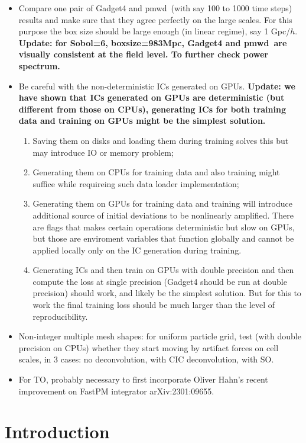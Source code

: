 \documentclass[usenatbib]{mnras}
\newcommand{\pmwd}{{\usefont{T1}{nova}{m}{sl}pmwd}}
\begin{document}
\begin{itemize}
\item Compare one pair of Gadget4 and \pmwd\ (with say 100 to 1000 time
    steps) results and make sure that they agree perfectly on the large
    scales. For this purpose the box size should be large enough (in
    linear regime), say 1 Gpc/$h$.
    \textbf{Update: for Sobol=6, boxsize=983Mpc, Gadget4 and \pmwd\ are visually
    consistent at the field level. To further check power spectrum.}
\item Be careful with the non-deterministic ICs generated on GPUs.
      \textbf{Update: we have shown that ICs generated on GPUs are deterministic
      (but different from those on CPUs), generating ICs for both training data
      and training on GPUs might be the simplest solution.}
  \begin{enumerate}
  \item Saving them on disks and loading them during training solves
    this but may introduce IO or memory problem;
  \item Generating them on CPUs for training data and also training
    might suffice while requireing such data loader implementation;
  \item Generating them on GPUs for training data and training will
    introduce additional source of initial deviations to be nonlinearly
    amplified. There are flags that makes certain operations
    deterministic but slow on GPUs, but those are enviroment variables
    that function globally and cannot be applied locally only on the IC
    generation during training.
  \item Generating ICs and then train on GPUs with double precision and
    then compute the loss at single precision (Gadget4 should be run at
    double precision) should work, and likely be the simplest solution.
    But for this to work the final training loss should be much larger
    than the level of reproducibility.
  \end{enumerate}
\item Non-integer multiple mesh shapes: for uniform particle grid, test
  (with double precision on CPUs) whether they start moving by artifact
  forces on cell scales, in 3 cases: no deconvolution, with CIC
  deconvolution, with SO.
\item For TO, probably necessary to first incorporate Oliver Hahn's
  recent improvement on FastPM integrator arXiv:2301:09655.
\end{itemize}


\section{Introduction}
\end{document}
